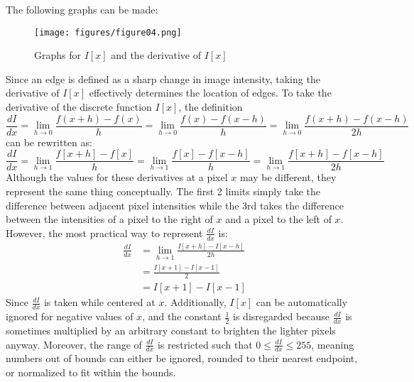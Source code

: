 \documentclass{article}
\begin{document}
The following graphs can be made:
\begin{figure}[!hbtp]
    \centering
    \texttt{[image: figures/figure04.png]}
    \caption[{Graphs for $I[x]$ and the derivative of $I[x]$}]{\centering Graphs for $I[x]$ and the derivative of $I[x]$}
    \label{fig:Graphs for $I[x]$ and the derivative of $I[x]$}
\end{figure}
Since an edge is defined as a sharp change in image intensity, taking the derivative of $I[x]$
effectively determines the location of edges. To take the derivative of the discrete function $I[x]$,
 the definition
\begin{equation*}
    \frac{dI}{dx} = \lim_{h \to 0}{\frac{f(x+h) - f(x)}{h} = \lim_{h \to 0}{\frac{f(x) - f(x-h)}{h}} = \lim_{h \to 0}{\frac{f(x+h) - f(x-h)}{2h}}}
\end{equation*}
can be rewritten as:
\begin{equation}
    \frac{dI}{dx} = \lim_{h \to 1}{\frac{f[x+h] - f[x]}{h} = \lim_{h \to 1}{\frac{f[x] - f[x-h]}{h}} = \lim_{h \to 1}{\frac{f[x+h] - f[x-h]}{2h}}}
\end{equation}
Although the values for these derivatives at a pixel $x$ may be different, they represent the same thing conceptually. The first 2 limits simply take the difference between adjacent pixel intensities while the 3rd takes the difference between the intensities of a pixel to the right of $x$ and a pixel to the left of $x$. However, the most practical way to represent $\frac{dI}{dx}$ is:
\begin{align}
    \frac{dI}{dx} &= \lim_{h \to 1}{\frac{I[x+h] - I[x-h]}{2h}} \nonumber \\
    &= \frac{I[x+1] - I[x-1]}{2} \nonumber \\
    &= I[x+1] - I[x-1]
\end{align}
Since $\frac{dI}{dx}$ is taken while centered at $x$. Additionally, $I[x]$ can be automatically ignored for negative values of $x$, and the constant $\frac{1}{2}$ is disregarded because $\frac{dI}{dx}$ is sometimes multiplied by an arbitrary constant to brighten the lighter pixels anyway. Moreover, the range of $\frac{dI}{dx}$ is restricted such that $0 \le \frac{dI}{dx} \le 255$, meaning numbers out of bounds can either be ignored, rounded to their nearest endpoint, or normalized to fit within the bounds.
\end{document}
